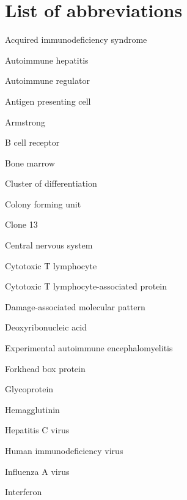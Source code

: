 \chapter*{List of abbreviations}

\setlength{\parindent}{0pt}
\setlength{\parskip}{3pt}
 \tabto{5.5em} Acquired immunodeficiency syndrome

 \tabto{5.5em} Autoimmune hepatitis

 \tabto{5.5em} Autoimmune regulator

 \tabto{5.5em} Antigen presenting cell

 \tabto{5.5em} Armstrong

 \tabto{5.5em} B cell receptor

 \tabto{5.5em} Bone marrow

 \tabto{5.5em} Cluster of differentiation

 \tabto{5.5em} Colony forming unit

 \tabto{5.5em} Clone 13

 \tabto{5.5em} Central nervous system


 \tabto{5.5em} Cytotoxic T lymphocyte

 \tabto{5.5em} Cytotoxic T lymphocyte-associated protein

 \tabto{5.5em} Damage-associated molecular pattern

 \tabto{5.5em} Deoxyribonucleic acid 

 \tabto{5.5em} Experimental autoimmune encephalomyelitis

 \tabto{5.5em} Forkhead box protein

 \tabto{5.5em} Glycoprotein

 \tabto{5.5em} Hemagglutinin

 \tabto{5.5em} Hepatitis C virus

 \tabto{5.5em} Human immunodeficiency virus

 \tabto{5.5em} Influenza A virus

 \tabto{5.5em} Interferon

